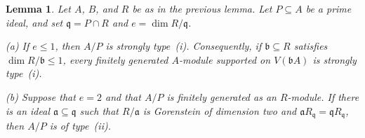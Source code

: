 \documentclass[11pt,letterpaper]{amsart}
\theoremstyle{plain}
\newtheorem{lem}[thm]{Lemma}
\theoremstyle{definition}
\theoremstyle{remark}
\begin{document}
\begin{lem}\label{lem:projection-types}
Let $A$, $B$, and $R$ be as in the previous lemma. Let $P\subseteq A$
be a prime ideal, and set $\mathfrak q=P\cap R$ and
$e=\dim R/\mathfrak q$.

\par\smallskip\noindent\textup{(a)} If $e\leq1$, then $A/P$ is strongly type~(i). Consequently, if $\mathfrak b\subseteq R$ satisfies $\dim R/\mathfrak b\leq1$, every finitely generated $A$-module supported on $V(\mathfrak bA)$ is strongly type~(i).

\par\smallskip\noindent\textup{(b)} Suppose that $e=2$ and that $A/P$ is finitely generated as an $R$-module. If there is an ideal $\mathfrak a\subseteq\mathfrak q$ such that $R/\mathfrak a$ is Gorenstein of dimension two and $\mathfrak aR_{\mathfrak q}=\mathfrak qR_{\mathfrak q}$, then $A/P$ is of type~(ii).
\end{lem}
\end{document}
